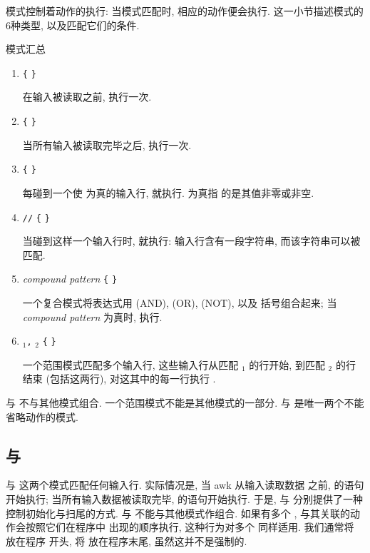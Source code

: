模式控制着动作的执行: 当模式匹配时, 相应的动作便会执行.
这一小节描述模式的6种类型, 以及匹配它们的条件.
\begin{summary}{模式汇总}
    \begin{enumerate}
        \item \BEGIN \verb'{' \stmt \verb'}' \par
            在输入被读取之前, \stmt 执行一次.
        \item \END \verb'{' \stmt \verb'}'      \par
            当所有输入被读取完毕之后, \stmt 执行一次.
        \item \expr \verb'{' \stmt \verb'}' \par
            每碰到一个使 \expr 为真的输入行, \stmt 就执行. \expr 为真指
            的是其值非零或非空.
        \item \verb'/'\regexpr\verb'/' \verb'{' \stmt \verb'}' \par
            当碰到这样一个输入行时, \stmt 就执行: 输入行含有一段字符串,
            而该字符串可以被 \regexpr 匹配.
        \item \textit{compound pattern} \verb'{' \stmt \verb'}' \par
            一个复合模式将表达式用 \AND{}(AND), \OR{}(OR), \NOT{}(NOT), 以及
            括号组合起来; 当 \textit{compound pattern} 为真时, \stmt 执行.
        \item \pat$_1$\verb',' \pat$_2$ \verb'{' \stmt{}\verb'}' \par
            一个范围模式匹配多个输入行, 这些输入行从匹配 \pat$_1$ 的行开始,
            到匹配 \pat$_2$ 的行结束 (包括这两行), 对这其中的每一行执行
            \stmt.
    \end{enumerate}
    \BEGIN 与 \END 不与其他模式组合. 一个范围模式不能是其他模式的一部分.
    \BEGIN 与 \END 是唯一两个不能省略动作的模式.
\end{summary}

\subsection{\textbf{\BEGIN} 与 \textbf{\END}}
\label{subsec:the_awk_language_begin_and_end}

\BEGIN 与 \END 这两个模式匹配任何输入行. 实际情况是, 当 awk 从输入读取数据
之前, \BEGIN 的语句开始执行;
当所有输入数据被读取完毕, \END 的语句开始执行.
于是, \BEGIN 与 \END 分别提供了一种控制初始化与扫尾的方式. \BEGIN 与 \END
不能与其他模式作组合. 如果有多个 \BEGIN, 与其关联的动作会按照它们在程序中
出现的顺序执行, 这种行为对多个 \END 同样适用. 我们通常将 \BEGIN 放在程序
开头, 将 \END 放在程序末尾, 虽然这并不是强制的.

